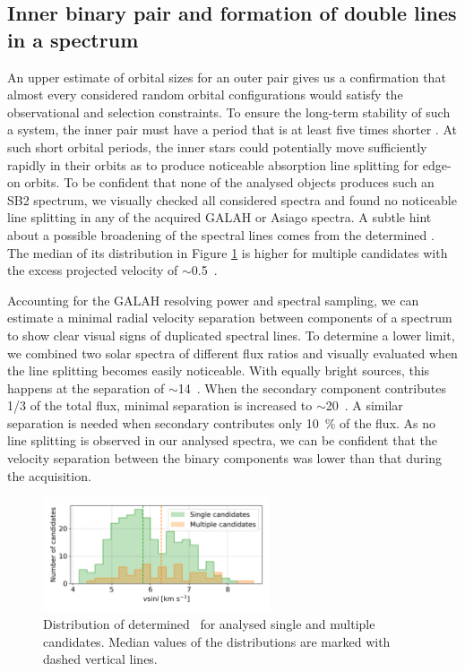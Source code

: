 \subsection{Inner binary pair and formation of double lines in a spectrum}
\label{sec:orbits_sb2}
An upper estimate of orbital sizes for an outer pair gives us a confirmation that almost every considered random orbital configurations would satisfy the observational and selection constraints. To ensure the long-term stability of such a system, the inner pair must have a period that is at least five times shorter \cite{2006epbm.book.....E}. At such short orbital periods, the inner stars could potentially move sufficiently rapidly in their orbits as to produce noticeable absorption line splitting for edge-on orbits. To be confident that none of the analysed objects produces such an SB2 spectrum, we visually checked all considered spectra and found no noticeable line splitting in any of the acquired GALAH or Asiago spectra. A subtle hint about a possible broadening of the spectral lines comes from the determined \vsin. The median of its distribution in Figure \ref{fig:vsini_hist} is higher for multiple candidates with the excess projected velocity of $\sim$0.5~\kms.

Accounting for the GALAH resolving power and spectral sampling, we can estimate a minimal radial velocity separation between components of a spectrum to show clear visual signs of duplicated spectral lines. To determine a lower limit, we combined two solar spectra of different flux ratios and visually evaluated when the line splitting becomes easily noticeable. With equally bright sources, this happens at the separation of $\sim$14~\kms. When the secondary component contributes 1/3 of the total flux, minimal separation is increased to $\sim$20~\kms. A similar separation is needed when secondary contributes only 10~\% of the flux. As no line splitting is observed in our analysed spectra, we can be confident that the velocity separation between the binary components was lower than that during the acquisition.

\begin{figure}
	\centering
	\includegraphics[width=0.6\textwidth]{hist_Vsini_cannon_ebv_c3_07.png}
	\caption{Distribution of determined \vsin\ for analysed single and multiple candidates. Median values of the distributions are marked with dashed vertical lines.}
	\label{fig:vsini_hist}
\end{figure}

